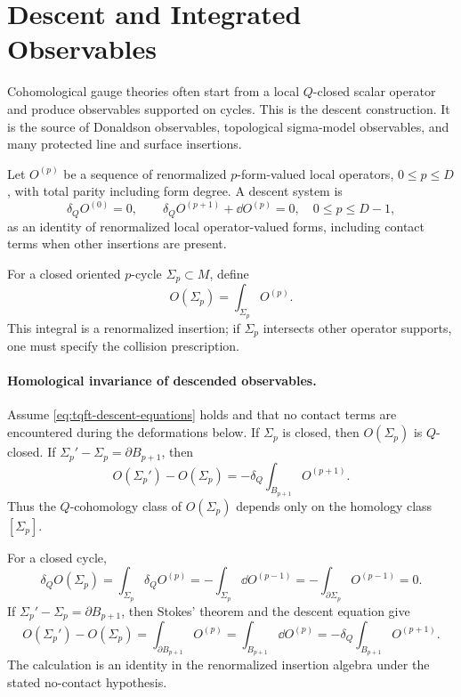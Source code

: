 \section{Descent and Integrated Observables}

Cohomological gauge theories often start from a local \(Q\)-closed scalar
operator and produce observables supported on cycles.  This is the descent
construction.  It is the source of Donaldson observables, topological
sigma-model observables, and many protected line and surface insertions.

\begin{definition}
\label{def:tqft-descent-equations}
Let \(O^{(p)}\) be a sequence of renormalized \(p\)-form-valued local
operators, \(0\le p\le D\), with total parity including form degree.  A
descent system is
\begin{equation}
  \delta_Q O^{(0)}=0,
  \qquad
  \delta_Q O^{(p+1)}+\dd O^{(p)}=0,
  \quad 0\le p\le D-1,
  \label{eq:tqft-descent-equations}
\end{equation}
as an identity of renormalized local operator-valued forms, including
contact terms when other insertions are present.
\end{definition}

For a closed oriented \(p\)-cycle \(\Sigma_p\subset M\), define
\[
  O(\Sigma_p)=\int_{\Sigma_p}O^{(p)}.
\]
This integral is a renormalized insertion; if \(\Sigma_p\) intersects other
operator supports, one must specify the collision prescription.

\paragraph{Homological invariance of descended observables.}
Assume \eqref{eq:tqft-descent-equations} holds and that no contact terms are
encountered during the deformations below.  If \(\Sigma_p\) is closed, then
\(O(\Sigma_p)\) is \(Q\)-closed.  If
\(\Sigma_p'-\Sigma_p=\partial B_{p+1}\), then
\begin{equation}
  O(\Sigma_p')-O(\Sigma_p)
  =
  -\delta_Q\int_{B_{p+1}}O^{(p+1)} .
  \label{eq:tqft-homologous-descendants-q-exact}
\end{equation}
Thus the \(Q\)-cohomology class of \(O(\Sigma_p)\) depends only on the
homology class \([\Sigma_p]\).

For a closed cycle,
\[
  \delta_Q O(\Sigma_p)
  =
  \int_{\Sigma_p}\delta_QO^{(p)}
  =
  -\int_{\Sigma_p}\dd O^{(p-1)}
  =
  -\int_{\partial\Sigma_p}O^{(p-1)}
  =
  0 .
\]
If \(\Sigma_p'-\Sigma_p=\partial B_{p+1}\), then Stokes' theorem and the
descent equation give
\[
  O(\Sigma_p')-O(\Sigma_p)
  =
  \int_{\partial B_{p+1}}O^{(p)}
  =
  \int_{B_{p+1}}\dd O^{(p)}
  =
  -\delta_Q\int_{B_{p+1}}O^{(p+1)} .
\]
The calculation is an identity in the renormalized insertion algebra under
the stated no-contact hypothesis.


